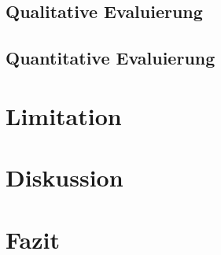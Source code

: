 \documentclass[12pt,letterpaper,ngerman]{article}
\begin{document}
\subsection{Qualitative Evaluierung} 
\subsection{Quantitative Evaluierung} 
\section{Limitation}
\section{Diskussion}
\section{Fazit}
\end{document}
